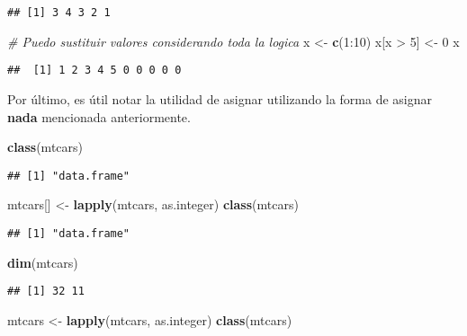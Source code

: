 \documentclass[]{article}
\newenvironment{Shaded}{\begin{snugshade}}{\end{snugshade}}
\newcommand{\KeywordTok}[1]{\textcolor[rgb]{0.13,0.29,0.53}{\textbf{{#1}}}}
\newcommand{\DecValTok}[1]{\textcolor[rgb]{0.00,0.00,0.81}{{#1}}}
\newcommand{\StringTok}[1]{\textcolor[rgb]{0.31,0.60,0.02}{{#1}}}
\newcommand{\CommentTok}[1]{\textcolor[rgb]{0.56,0.35,0.01}{\textit{{#1}}}}
\newcommand{\NormalTok}[1]{{#1}}
\begin{document}
\begin{verbatim}
## [1] 3 4 3 2 1
\end{verbatim}

\begin{Shaded}
\begin{Highlighting}[]
\CommentTok{# Puedo sustituir valores considerando toda la logica }
\NormalTok{x <-}\StringTok{ }\KeywordTok{c}\NormalTok{(}\DecValTok{1}\NormalTok{:}\DecValTok{10}\NormalTok{)}
\NormalTok{x[x >}\StringTok{ }\DecValTok{5}\NormalTok{] <-}\StringTok{ }\DecValTok{0}
\NormalTok{x}
\end{Highlighting}
\end{Shaded}

\begin{verbatim}
##  [1] 1 2 3 4 5 0 0 0 0 0
\end{verbatim}

Por último, es útil notar la utilidad de asignar utilizando la forma de
asignar \textbf{nada} mencionada anteriormente.

\begin{Shaded}
\begin{Highlighting}[]
\KeywordTok{class}\NormalTok{(mtcars)}
\end{Highlighting}
\end{Shaded}

\begin{verbatim}
## [1] "data.frame"
\end{verbatim}

\begin{Shaded}
\begin{Highlighting}[]
\NormalTok{mtcars[] <-}\StringTok{ }\KeywordTok{lapply}\NormalTok{(mtcars, as.integer)}
\KeywordTok{class}\NormalTok{(mtcars)}
\end{Highlighting}
\end{Shaded}

\begin{verbatim}
## [1] "data.frame"
\end{verbatim}

\begin{Shaded}
\begin{Highlighting}[]
\KeywordTok{dim}\NormalTok{(mtcars)}
\end{Highlighting}
\end{Shaded}

\begin{verbatim}
## [1] 32 11
\end{verbatim}

\begin{Shaded}
\begin{Highlighting}[]
\NormalTok{mtcars <-}\StringTok{ }\KeywordTok{lapply}\NormalTok{(mtcars, as.integer)}
\KeywordTok{class}\NormalTok{(mtcars)}
\end{Highlighting}
\end{Shaded}
\end{document}
